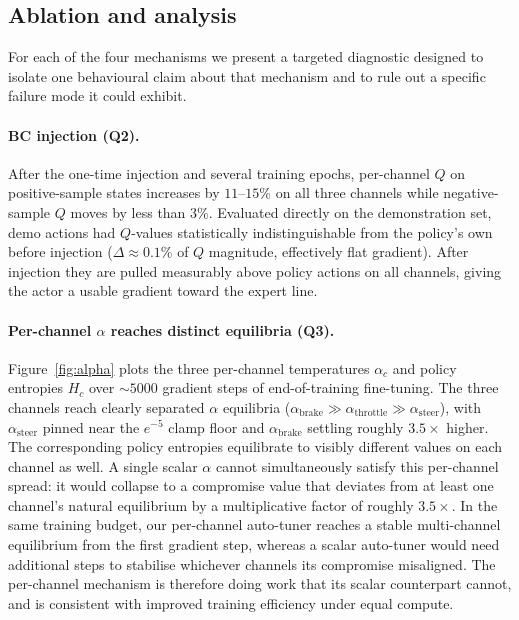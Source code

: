 \documentclass{article}
\begin{document}
\subsection{Ablation and analysis}
\label{sec:ablation}

For each of the four mechanisms we present a targeted diagnostic
designed to isolate one behavioural claim about that mechanism and
to rule out a specific failure mode it could exhibit.

\paragraph{BC injection (Q2).}
After the one-time injection and several training epochs, per-channel
$Q$ on positive-sample states increases by $11$--$15\%$ on all three
channels while negative-sample $Q$ moves by less than $3\%$.
Evaluated directly on the demonstration set, demo actions had
$Q$-values statistically indistinguishable from the policy's own
before injection ($\Delta \approx 0.1\%$ of $Q$ magnitude, effectively
flat gradient). After injection they are pulled measurably above
policy actions on all channels, giving the actor a usable gradient
toward the expert line.

\paragraph{Per-channel $\alpha$ reaches distinct equilibria (Q3).}
Figure~\ref{fig:alpha} plots the three per-channel temperatures
$\alpha_c$ and policy entropies $H_c$ over $\sim\!5000$ gradient
steps of end-of-training fine-tuning. The three channels reach
clearly separated $\alpha$ equilibria
($\alpha_\mathrm{brake} \gg \alpha_\mathrm{throttle} \gg \alpha_\mathrm{steer}$),
with $\alpha_\mathrm{steer}$ pinned near the $e^{-5}$ clamp floor and
$\alpha_\mathrm{brake}$ settling roughly $3.5\times$ higher. The
corresponding policy entropies equilibrate to visibly different
values on each channel as well. A single scalar $\alpha$ cannot
simultaneously satisfy this per-channel spread: it would collapse to
a compromise value that deviates from at least one channel's natural
equilibrium by a multiplicative factor of roughly $3.5\times$. In
the same training budget, our per-channel auto-tuner reaches a
stable multi-channel equilibrium from the first gradient step,
whereas a scalar auto-tuner would need additional steps to stabilise
whichever channels its compromise misaligned. The per-channel
mechanism is therefore doing work that its scalar counterpart
cannot, and is consistent with improved training efficiency under
equal compute.
\end{document}

